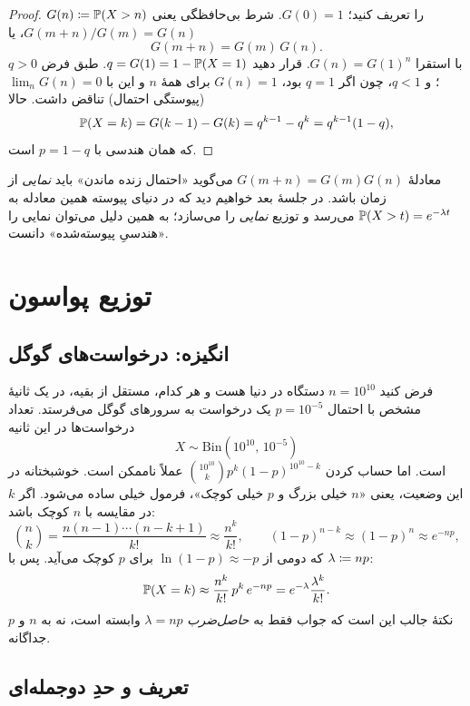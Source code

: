 \begin{proof}
$G(n)\defeq\P(X>n)$ را تعریف کنید؛ $G(0)=1$. شرط بی‌حافظگی یعنی $G(m+n)/G(m)=G(n)$، یا
\[ G(m+n)=G(m)\,G(n). \]
با استقرا $G(n)=G(1)^n$. قرار دهید $q=G(1)=1-\P(X=1)$. طبق فرض $q>0$؛ و $q<1$، چون اگر $q=1$ بود، $G(n)=1$ برای همهٔ $n$ و این با $\lim_nG(n)=0$ (پیوستگی احتمال) تناقض داشت. حالا
\[ \P(X=k)=G(k-1)-G(k)=q^{k-1}-q^k=q^{k-1}(1-q), \]
که همان  هندسی با $p=1-q$ است.
\end{proof}

\begin{note}
معادلهٔ $G(m+n)=G(m)G(n)$ می‌گوید «احتمال زنده ماندن» باید \emph{نمایی} از زمان باشد. در جلسهٔ بعد خواهیم دید که در دنیای پیوسته همین معادله به $\P(X>t)=e^{-\lambda t}$ می‌رسد و توزیع \emph{نمایی} را می‌سازد؛ به همین دلیل می‌توان نمایی را «هندسیِ پیوسته‌شده» دانست.
\end{note}

\section{توزیع پواسون}
\label{sec:poisson}

\subsection{انگیزه: درخواست‌های گوگل}

فرض کنید $n=10^{10}$ دستگاه در دنیا هست و هر کدام، مستقل از بقیه، در یک ثانیهٔ مشخص با احتمال $p=10^{-5}$ یک درخواست به سرورهای گوگل می‌فرستد. تعداد درخواست‌ها در این ثانیه
\[ X\sim\mathrm{Bin}(10^{10},\,10^{-5}) \]
است. اما حساب کردن $\binom{10^{10}}{k}p^k(1-p)^{10^{10}-k}$ عملاً ناممکن است. خوشبختانه در این وضعیت، یعنی «$n$ خیلی بزرگ و $p$ خیلی کوچک»، فرمول خیلی ساده می‌شود. اگر $k$ در مقایسه با $n$ کوچک باشد:
\[ \binom nk=\frac{n(n-1)\cdots(n-k+1)}{k!}\approx\frac{n^k}{k!},\qquad (1-p)^{n-k}\approx(1-p)^n\approx e^{-np}, \]
که دومی از $\ln(1-p)\approx-p$ برای $p$ کوچک می‌آید. پس با $\lambda\defeq np$:
\[ \P(X=k)\approx\frac{n^k}{k!}\,p^k\,e^{-np}=e^{-\lambda}\frac{\lambda^k}{k!}. \]
نکتهٔ جالب این است که جواب فقط به \emph{حاصل‌ضرب} $\lambda=np$ وابسته است، نه به $n$ و $p$ جداگانه.

\subsection{تعریف و حدِ دوجمله‌ای}

